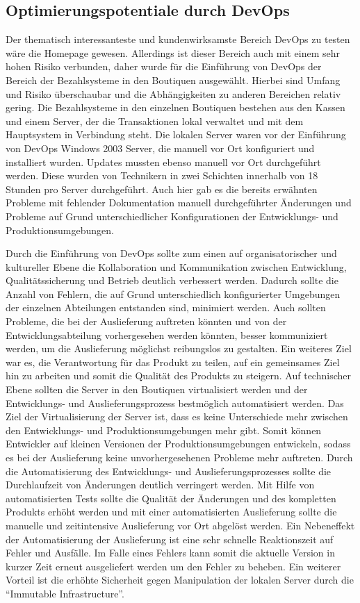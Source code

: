 \subsection{Optimierungspotentiale durch DevOps}
Der thematisch interessanteste und kundenwirksamste Bereich DevOps zu testen wäre die Homepage gewesen. 
Allerdings ist dieser Bereich auch mit einem sehr hohen Risiko verbunden, daher wurde für die Einführung von DevOps der Bereich der Bezahlsysteme in den Boutiquen ausgewählt. 
Hierbei sind Umfang und Risiko überschaubar und die Abhängigkeiten zu anderen Bereichen relativ gering.
Die Bezahlsysteme in den einzelnen Boutiquen bestehen aus den Kassen und einem Server, der die Transaktionen lokal verwaltet und mit dem Hauptsystem in Verbindung steht. 
Die lokalen Server waren vor der Einführung von DevOps Windows 2003 Server, die manuell vor Ort konfiguriert und installiert wurden. 
Updates mussten ebenso manuell vor Ort durchgeführt werden. Diese wurden von Technikern in zwei Schichten innerhalb von 18 Stunden pro Server durchgeführt. 
Auch hier gab es die bereits erwähnten Probleme mit fehlender Dokumentation manuell durchgeführter Änderungen und Probleme auf Grund unterschiedlicher Konfigurationen der Entwicklungs- und Produktionsumgebungen. 
\parencite[Vgl.][S. 5]{Reed:2014}

Durch die Einführung von DevOps sollte zum einen auf organisatorischer und kultureller Ebene die Kollaboration und Kommunikation zwischen Entwicklung, Qualitätssicherung und Betrieb deutlich verbessert werden. 
Dadurch sollte die Anzahl von Fehlern, die auf Grund unterschiedlich konfigurierter Umgebungen der einzelnen Abteilungen entstanden sind, minimiert werden. 
Auch sollten Probleme, die bei der Auslieferung auftreten könnten und von der Entwicklungsabteilung vorhergesehen werden könnten, besser kommuniziert werden, um die Auslieferung möglichst reibungslos zu gestalten. 
Ein weiteres Ziel war es, die Verantwortung für das Produkt zu teilen, auf ein gemeinsames Ziel hin zu arbeiten und somit die Qualität des Produkts zu steigern. 
Auf technischer Ebene sollten die Server in den Boutiquen virtualisiert werden und der Entwicklungs- und Auslieferungsprozess bestmöglich automatisiert werden. 
Das Ziel der Virtualisierung der Server ist, dass es keine Unterschiede mehr zwischen den Entwicklungs- und Produktionsumgebungen mehr gibt. 
Somit können Entwickler auf kleinen Versionen der Produktionsumgebungen entwickeln, sodass es bei der Auslieferung keine unvorhergesehenen Probleme mehr auftreten. 
Durch die Automatisierung des Entwicklungs- und Auslieferungsprozesses sollte die Durchlaufzeit von Änderungen deutlich verringert werden. 
Mit Hilfe von automatisierten Tests sollte die Qualität der Änderungen und des kompletten Produkts erhöht werden und mit einer automatisierten Auslieferung sollte die manuelle und zeitintensive Auslieferung vor Ort abgelöst werden. 
Ein Nebeneffekt der Automatisierung der Auslieferung ist eine sehr schnelle Reaktionszeit auf Fehler und Ausfälle. 
Im Falle eines Fehlers kann somit die aktuelle Version in kurzer Zeit erneut ausgeliefert werden um den Fehler zu beheben. 
Ein weiterer Vorteil ist die erhöhte Sicherheit gegen Manipulation der lokalen Server durch die \enquote{Immutable Infrastructure}. 
\parencite[Vgl.][S. 5]{Reed:2014}

